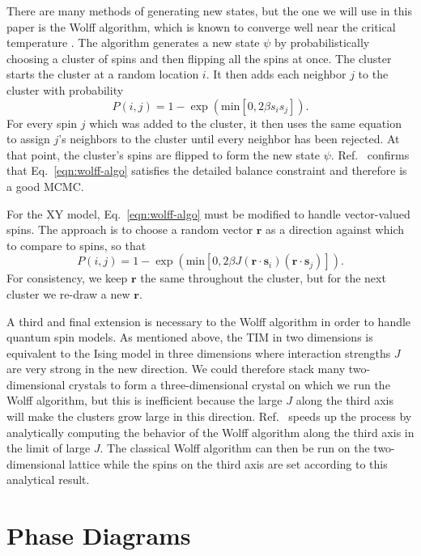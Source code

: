\documentclass[
  amsmath,
  amssymb,
  aps,
  twocolumn,
  nofootinbib,
  floatfix,
]{revtex4-2}
\newcommand{\parens}[1]{\left ( #1 \right )}
\begin{document}
There are many methods of generating new states, but the one we will use in this paper is the Wolff algorithm, which is known to converge well near the critical temperature \cite{wolff1989collective}. The algorithm generates a new state $\psi$ by probabilistically choosing a cluster of spins and then flipping all the spins at once. The cluster starts the cluster at a random location $i$. It then adds each neighbor $j$ to the cluster with probability
\begin{equation}
  P(i,j) = 1 - \exp\parens{\mathrm{min}\left[0, 2\beta s_i s_j \right]}.
  \label{eqn:wolff-algo}
\end{equation}
For every spin $j$ which was added to the cluster, it then uses the same equation to assign $j$'s neighbors to the cluster until every neighbor has been rejected. At that point, the cluster's spins are flipped to form the new state $\psi$. Ref.~\cite{wolff1989collective} confirms that Eq.~\ref{eqn:wolff-algo} satisfies the detailed balance constraint and therefore is a good MCMC.

For the XY model, Eq.~\ref{eqn:wolff-algo} must be modified to handle vector-valued spins. The approach is to choose a random vector $\bm r$ as a direction against which to compare to spins, so that
\begin{equation}
  P(i,j) = 1 - \exp\parens{\mathrm{min}\left[0, 2\beta J (\bm r \cdot \bm s_i)(\bm r \cdot \bm s_j) \right]}.
\end{equation}
For consistency, we keep $\bm r$ the same throughout the cluster, but for the next cluster we re-draw a new $\bm r$.

A third and final extension is necessary to the Wolff algorithm in order to handle quantum spin models. As mentioned above, the TIM in two dimensions is equivalent to the Ising model in three dimensions where interaction strengths $J$ are very strong in the new direction. We could therefore stack many two-dimensional crystals to form a three-dimensional crystal on which we run the Wolff algorithm, but this is inefficient because the large $J$ along the third axis will make the clusters grow large in this direction. Ref.~\cite{blote2002cluster} speeds up the process by analytically computing the behavior of the Wolff algorithm along the third axis in the limit of large $J$. The classical Wolff algorithm can then be run on the two-dimensional lattice while the spins on the third axis are set according to this analytical result.

\section{Phase Diagrams}
\label{sec:results}
\end{document}
